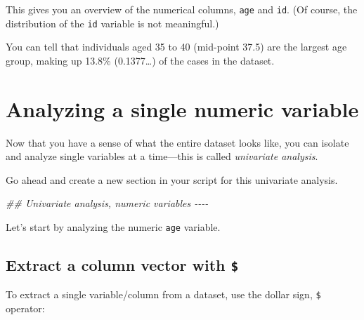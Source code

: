 \documentclass[
  letterpaper,
  DIV=11,
  numbers=noendperiod]{scrreprt}
\newenvironment{Shaded}{\begin{snugshade}}{\end{snugshade}}
\newcommand{\CommentTok}[1]{\textcolor[rgb]{0.37,0.37,0.37}{#1}}
\newcommand{\DocumentationTok}[1]{\textcolor[rgb]{0.37,0.37,0.37}{\textit{#1}}}
\newcommand{\NormalTok}[1]{\textcolor[rgb]{0.00,0.23,0.31}{#1}}
\newcommand{\SpecialCharTok}[1]{\textcolor[rgb]{0.37,0.37,0.37}{#1}}
\begin{document}
This gives you an overview of the numerical columns, \texttt{age} and
\texttt{id}. (Of course, the distribution of the \texttt{id} variable is
not meaningful.)

You can tell that individuals aged 35 to 40 (mid-point 37.5) are the
largest age group, making up 13.8\% (0.1377\ldots) of the cases in the
dataset.

\section{Analyzing a single numeric
variable}\label{analyzing-a-single-numeric-variable}

Now that you have a sense of what the entire dataset looks like, you can
isolate and analyze single variables at a time---this is called
\emph{univariate analysis}.

Go ahead and create a new section in your script for this univariate
analysis.

\begin{Shaded}
\begin{Highlighting}[]
\DocumentationTok{\#\# Univariate analysis, numeric variables {-}{-}{-}{-}}
\end{Highlighting}
\end{Shaded}

Let's start by analyzing the numeric \texttt{age} variable.

\subsection{\texorpdfstring{Extract a column vector with
\texttt{\$}}{Extract a column vector with \$}}\label{extract-a-column-vector-with}

To extract a single variable/column from a dataset, use the dollar sign,
\texttt{\$} operator:

\begin{Shaded}
\end{Shaded}
\end{document}
